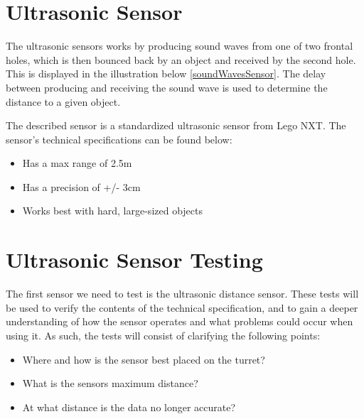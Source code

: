 \section{Ultrasonic Sensor}\label{SensTheoUltra}
The ultrasonic sensors works by producing sound waves from
one of two frontal holes, which is then bounced back by an object and received
by the second hole. This is displayed in the illustration below
\autoref{soundWavesSensor}.
The delay between producing and receiving the sound wave is used to determine the
distance to a given object.


The described sensor is a standardized ultrasonic sensor from Lego NXT. The
sensor's technical specifications \citep{Ultrasonic_sensor} can be found below:
\begin{itemize}
  \item Has a max range of 2.5m
  \item Has a precision of +/- 3cm
  \item Works best with hard, large-sized objects
\end{itemize}


\section{Ultrasonic Sensor Testing}\label{SensorTest}
The first sensor we need to test is the ultrasonic distance sensor. These tests
will be used to verify the contents of the technical specification, and
to gain a deeper understanding of how the sensor operates and what
problems could occur when using it. As such, the tests will consist of
clarifying the following points:
\begin{itemize}
  \item Where and how is the sensor best placed on the turret?
  \item What is the sensors maximum distance?
  \item At what distance is the data no longer accurate?
\end{itemize}

